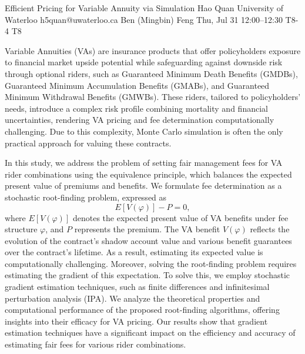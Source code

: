 \begin{talk}
  {Efficient Pricing for Variable Annuity via Simulation}%
  {Hao Quan}%
  {University of Waterloo}%
  {h5quan@uwaterloo.ca}%
  {Ben (Mingbin) Feng}%
  {}%
  {Thu, Jul 31 12:00–12:30}%
  {T8-4}%
  {T8}%
  
				

Variable Annuities (VAs) are insurance products that offer policyholders exposure to financial market upside potential while safeguarding against downside risk through optional riders, such as Guaranteed Minimum Death Benefits (GMDBs), Guaranteed Minimum Accumulation Benefits (GMABs), and Guaranteed Minimum Withdrawal Benefits (GMWBs). These riders, tailored to policyholders’ needs, introduce a complex risk profile combining mortality and financial uncertainties, rendering VA pricing and fee determination computationally challenging. Due to this complexity, Monte Carlo simulation is often the only practical approach for valuing these contracts.

In this study, we address the problem of setting fair management fees for VA rider combinations using the equivalence principle, which balances the expected present value of premiums and benefits. We formulate fee determination as a stochastic root-finding problem, expressed as
\[
E[V(\varphi)] - P = 0,
\]
where \( E[V(\varphi)] \) denotes the expected present value of VA benefits under fee structure \( \varphi \), and \( P \) represents the premium. The VA benefit \( V(\varphi) \) reflects the evolution of the contract’s shadow account value and various benefit guarantees over the contract’s lifetime. As a result, estimating its expected value is computationally challenging. Moreover, solving the root-finding problem requires estimating the gradient of this expectation. To solve this, we employ stochastic gradient estimation techniques, such as finite differences and infinitesimal perturbation analysis (IPA). We analyze the theoretical properties and computational performance of the proposed root-finding algorithms, offering insights into their efficacy for VA pricing. Our results show that gradient estimation techniques have a significant impact on the efficiency and accuracy of estimating fair fees for various rider combinations.
\end{talk}

